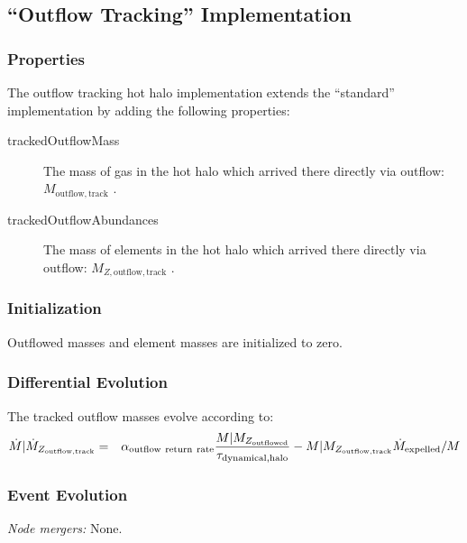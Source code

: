 \subsection{``Outflow Tracking'' Implementation}

\subsubsection{Properties}

The outflow tracking hot halo implementation extends the ``standard'' implementation by adding the following properties:
\begin{description}
 \item [{\normalfont \ttfamily trackedOutflowMass}] The mass of gas in the hot halo which arrived there directly via outflow: $M_\mathrm{outflow, track}$ {\normalfont \ttfamily [hotHaloTrackedOutflowMass]}.
 \item [{\normalfont \ttfamily trackedOutflowAbundances}] The mass of elements in the hot halo which arrived there directly via outflow: $M_{Z, \mathrm{outflow, track}}$ {\normalfont \ttfamily [hotHaloTrackedOutflowAbundances]}.
\end{description}

\subsubsection{Initialization}

Outflowed masses and element masses are initialized to zero.

\subsubsection{Differential Evolution}

The tracked outflow masses evolve according to:
\begin{eqnarray}
 \dot{M}|\dot{M}_{Z_\mathrm{outflow, track}} &=& \alpha_\mathrm{outflow~return~rate} {M|M_{Z_\mathrm{outflowed}}\over \tau_\mathrm{dynamical, halo}} -  M|M_{Z_\mathrm{outflow, track}} \dot{M}_\mathrm{expelled} / M\\
\end{eqnarray}

\subsubsection{Event Evolution}

\noindent\emph{Node mergers:} None.\\

